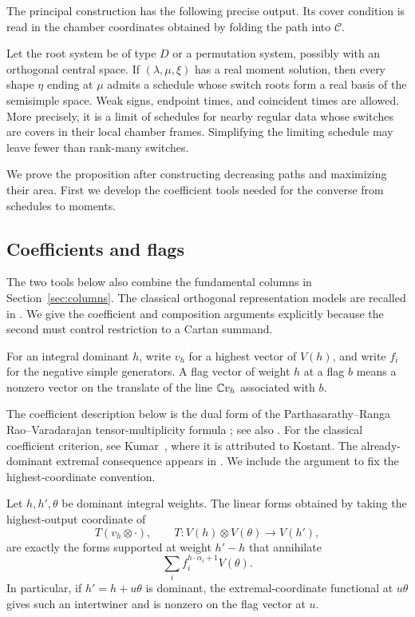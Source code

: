The principal construction has the following precise output.  Its
cover condition is read in the chamber coordinates obtained by
folding the path into $\mathcal C$.

\begin{proposition}\label{prop:basic-schedule}
Let the root system be of type $D$ or a permutation system, possibly
with an orthogonal central space.  If $(\lambda,\mu,\xi)$ has a real
moment solution, then every shape $\eta$ ending at $\mu$ admits a
schedule whose switch roots form a real basis of the semisimple
space.  Weak signs, endpoint times, and coincident times are allowed.
More precisely, it is a limit of schedules for nearby regular data
whose switches are covers in their local chamber frames.  Simplifying
the limiting schedule may leave fewer than rank-many switches.
\end{proposition}

We prove the proposition after constructing decreasing paths and
maximizing their area.  First we develop the coefficient tools needed
for the converse from schedules to moments.

\subsection{Coefficients and flags}

The two tools below also combine the fundamental columns in
Section~\ref{sec:columns}.  The classical orthogonal representation
models are recalled in \cite[Lectures~19--20]{FH91}.  We give the
coefficient and composition arguments explicitly because the second
must control restriction to a Cartan summand.

For an integral dominant $h$, write $v_h$ for a highest vector of
$V(h)$, and write $f_i$ for the negative simple generators.  A flag
vector of weight $h$ at a flag $b$ means a nonzero vector on the
translate of the line $\mathbb C v_h$ associated with $b$.

The coefficient description below is the dual form of the
Parthasarathy--Ranga Rao--Varadarajan tensor-multiplicity formula
\cite{PRV67}; see also \cite[Theorems~1.1--1.2]{PY08}.  For the classical
coefficient criterion, see Kumar~\cite[Theorem~3.7]{Kumar2010}, where it
is attributed to Kostant. The already-dominant extremal consequence
appears in \cite[Corollary~3.8]{Kumar2010}. We include the argument to
fix the highest-coordinate convention.

\begin{lemma}\label{lem:coefficient}
Let $h,h',\theta$ be dominant integral weights.  The linear forms
obtained by taking the highest-output coordinate of
\[
 T(v_h\otimes {\cdot}),\qquad
 T:V(h)\otimes V(\theta)\longrightarrow V(h'),
\]
are exactly the forms supported at weight $h'-h$ that annihilate
\begin{equation}\label{real:coefficient-images}
 \sum_i f_i^{h\cdot\alpha_i+1}V(\theta).
\end{equation}
In particular, if $h'=h+u\theta$ is dominant, the extremal-coordinate
functional at $u\theta$ gives such an intertwiner and is nonzero on
the flag vector at $u$.
\end{lemma}


